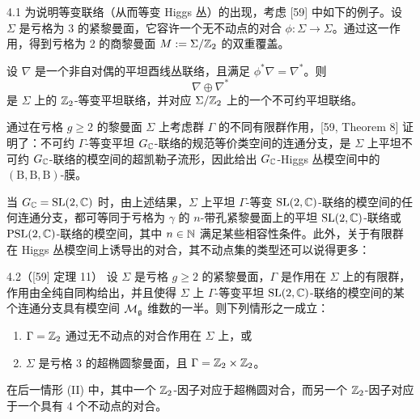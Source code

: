 \begin{exmp}{4.1}
为说明等变联络（从而等变 Higgs 丛）的出现，考虑 [59] 中如下的例子。设 $\Sigma$ 是亏格为 3 的紧黎曼面，它容许一个无不动点的对合 $\phi\colon\Sigma\to\Sigma$。通过这一作用，得到亏格为 2 的商黎曼面 $M:=\Sigma/\mathbb{Z}_2$ 的双重覆盖。

设 $\nabla$ 是一个非自对偶的平坦酉线丛联络，且满足 $\phi^*\nabla=\nabla^*$。则
\[
\nabla\oplus\nabla^*
\]
是 $\Sigma$ 上的 $\mathbb{Z}_2$-等变平坦联络，并对应 $\Sigma/\mathbb{Z}_2$ 上的一个不可约平坦联络。
\end{exmp}


通过在亏格 $g\ge 2$ 的黎曼面 $\Sigma$ 上考虑群 $\Gamma$ 的不同有限群作用，[59, Theorem 8] 证明了：不可约 $\Gamma$-等变平坦 $G_{\mathbb{C}}$-联络的规范等价类空间的连通分支，是 $\Sigma$ 上平坦不可约 $G_{\mathbb{C}}$-联络的模空间的超凯勒子流形，因此给出 $G_{\mathbb{C}}$-Higgs 丛模空间中的 $(\mathrm{B},\mathrm{B},\mathrm{B})$-膜。

当 $G_{\mathbb{C}}=\mathrm{SL}(2,\mathbb{C})$ 时，由上述结果，$\Sigma$ 上平坦 $\Gamma$-等变 $\mathrm{SL}(2,\mathbb{C})$-联络的模空间的任何连通分支，都可等同于亏格为 $\gamma$ 的 $n$-带孔紧黎曼面上的平坦 $\mathrm{SL}(2,\mathbb{C})$-联络或 $\mathrm{PSL}(2,\mathbb{C})$-联络的模空间，其中 $n\in\mathbb{N}$ 满足某些相容性条件。此外，关于有限群在 Higgs 丛模空间上诱导出的对合，其不动点集的类型还可以说得更多：

\begin{thm}{4.2（[59] 定理 11）}
设 $\Sigma$ 是亏格 $g\ge 2$ 的紧黎曼面，$\Gamma$ 是作用在 $\Sigma$ 上的有限群，作用由全纯自同构给出，并且使得 $\Sigma$ 上 $\Gamma$-等变平坦 $\mathrm{SL}(2,\mathbb{C})$-联络的模空间的某个连通分支具有模空间 $\mathcal{M}_{\mathfrak{g}}$ 维数的一半。则下列情形之一成立：
\begin{enumerate}[label=(\Roman*),leftmargin=2.8em]
\item $\Gamma=\mathbb{Z}_2$ 通过无不动点的对合作用在 $\Sigma$ 上，或
\item $\Sigma$ 是亏格 3 的超椭圆黎曼面，且 $\Gamma=\mathbb{Z}_2\times\mathbb{Z}_2$。
\end{enumerate}
在后一情形 (II) 中，其中一个 $\mathbb{Z}_2$-因子对应于超椭圆对合，而另一个 $\mathbb{Z}_2$-因子对应于一个具有 4 个不动点的对合。
\end{thm}


